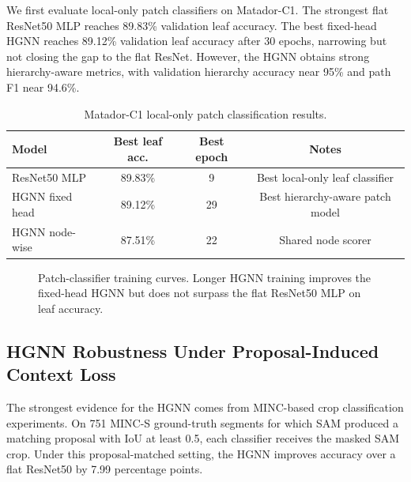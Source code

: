 \documentclass[11pt,twocolumn,letterpaper]{article}
\begin{document}
We first evaluate local-only patch classifiers on Matador-C1. The strongest flat ResNet50 MLP reaches 89.83\% validation leaf accuracy. The best fixed-head HGNN reaches 89.12\% validation leaf accuracy after 30 epochs, narrowing but not closing the gap to the flat ResNet. However, the HGNN obtains strong hierarchy-aware metrics, with validation hierarchy accuracy near 95\% and path F1 near 94.6\%.

\begin{table}[t]
\centering
\small
\begin{tabular}{lccc}
\toprule
Model & Best leaf acc. & Best epoch & Notes \\
\midrule
ResNet50 MLP & 89.83\% & 9 & Best local-only leaf classifier \\
HGNN fixed head & 89.12\% & 29 & Best hierarchy-aware patch model \\
HGNN node-wise & 87.51\% & 22 & Shared node scorer \\
\bottomrule
\end{tabular}
\caption{Matador-C1 local-only patch classification results.}
\label{tab:matador_patch}
\end{table}

\begin{figure}[t]
    \centering
    \caption{Patch-classifier training curves. Longer HGNN training improves the fixed-head HGNN but does not surpass the flat ResNet50 MLP on leaf accuracy.}
    \label{fig:patch_curves}
\end{figure}

\subsection{HGNN Robustness Under Proposal-Induced Context Loss}

The strongest evidence for the HGNN comes from MINC-based crop classification experiments. On 751 MINC-S ground-truth segments for which SAM produced a matching proposal with IoU at least 0.5, each classifier receives the masked SAM crop. Under this proposal-matched setting, the HGNN improves accuracy over a flat ResNet50 by 7.99 percentage points.
\end{document}
